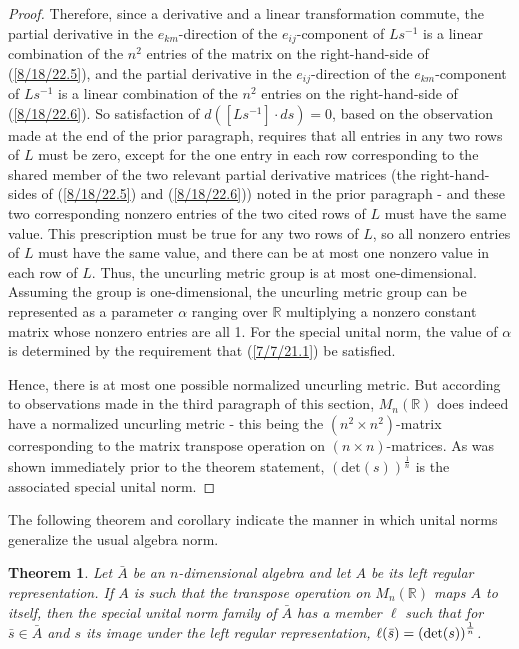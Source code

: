 \documentclass{amsart}
\numberwithin{equation}{section}
\newtheorem{theorem}{Theorem}
\theoremstyle{definition}
\numberwithin{theorem}{section}
\begin{document}
\begin{proof}
Therefore, since a derivative and a linear transformation commute, the partial derivative in the $e_{km}$-direction of the $e_{ij}$-component of $Ls^{-1}$ is a linear combination of the $n^2$ entries of the matrix on the right-hand-side of (\ref{8/18/22.5}), and  the partial derivative in the $e_{ij}$-direction of the $e_{km}$-component of $Ls^{-1}$ is a linear combination of the $n^2$ entries on the right-hand-side of (\ref{8/18/22.6}).
So satisfaction of \mbox{$d\left([Ls^{-1}]\cdot ds\right) = 0$,} based on the observation made at the end of the prior paragraph, requires that all entries in any two rows of $L$ must be zero, except for the one entry in each row corresponding to the shared member of the two relevant partial derivative matrices (the right-hand-sides of (\ref{8/18/22.5}) and (\ref{8/18/22.6})) noted in the prior paragraph - and these two corresponding nonzero entries of the two cited rows of $L$ must have the same value.  This prescription must be true for any two rows of $L$, so all nonzero entries of $L$ must have the same value, and there can be at most one nonzero value in each row of $L$.  Thus, the uncurling metric group is at most one-dimensional. Assuming the group is one-dimensional, the uncurling metric group can be represented as a parameter $\alpha$ ranging over $\mathbb{R}$ multiplying a nonzero constant matrix whose nonzero entries are all 1.  
For the special unital norm, the value of $\alpha$ is determined by the requirement that (\ref{7/7/21.1}) be satisfied. 

Hence, there is at most one possible normalized uncurling metric.  But according to observations made in the third paragraph of this section, $ M_n(\mathbb{R})$ does indeed have a normalized uncurling metric - this being the $(n^2\times n^2)$-matrix corresponding to the matrix transpose operation on $(n\times n)$-matrices.  As was shown immediately prior to the theorem statement, $(\mbox{det}(s))^{\frac{1}{n}}$ is the associated special unital norm.  
 \end{proof}
 
 The following theorem and corollary indicate the manner in which unital norms generalize the usual algebra norm.
 
 \begin{theorem}\label{5/13/22.1} Let $\bar{A}$ be an $n$-dimensional algebra and let $A$ be its left regular representation.  If $A$ is such that the transpose operation on $ M_n(\mathbb{R})$ maps $A$ to itself, then the special unital norm family of $\bar{A}$ has a member $\ell$ such that  for $\bar{s}\in\bar{A}$ and $s$ its image under the left regular representation, $\ell(\bar{s}) = \left({\rm det}(s)\right)^{\frac{1}{n}}$. 
\end{theorem}
\end{document}
